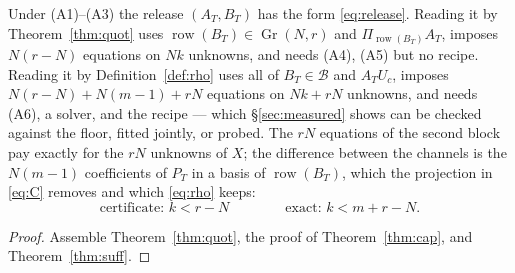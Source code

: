 \begin{corollary}\label{cor:two}
Under (A1)--(A3) the release $(A_T,B_T)$ has the form \eqref{eq:release}.
Reading it by Theorem~\ref{thm:quot} uses $\operatorname{row}(B_T)\in\operatorname{Gr}(N,r)$
and $\Pi_{\operatorname{row}(B_T)}A_T$, imposes $N(r-N)$ equations on $Nk$
unknowns, and needs (A4), (A5) but no recipe. Reading it by
Definition~\ref{def:rho} uses all of $B_T\in\mathcal B$ and $A_TU_c$,
imposes $N(r-N)+N(m-1)+rN$ equations on $Nk+rN$ unknowns, and needs (A6),
a solver, and the recipe — which \S\ref{sec:measured} shows can be checked
against the floor, fitted jointly, or probed. The $rN$ equations of the second block pay exactly
for the $rN$ unknowns of $X$; the difference between the channels is the
$N(m-1)$ coefficients of $P_T$ in a basis of $\operatorname{row}(B_T)$, which
the projection in \eqref{eq:C} removes and which \eqref{eq:rho} keeps:
\[
  \text{certificate: } k<r-N\qquad\qquad \text{exact: } k<m+r-N .
\]
\end{corollary}
\begin{proof}
Assemble Theorem~\ref{thm:quot}, the proof of Theorem~\ref{thm:cap}, and
Theorem~\ref{thm:suff}.
\end{proof}

